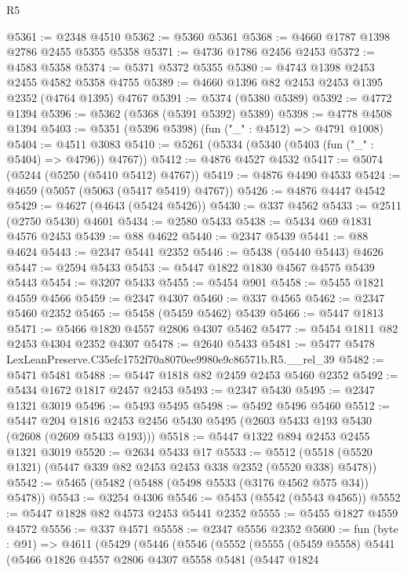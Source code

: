 \begin{lexlean}{R5}
\begin{coremodule}
@5361 := @2348 @4510
@5362 := @5360 @5361
@5368 := @4660 @1787 @1398 @2786 @2455 @5355 @5358
@5371 := @4736 @1786 @2456 @2453
@5372 := @4583 @5358
@5374 := @5371 @5372 @5355
@5380 := @4743 @1398 @2453 @2455 @4582 @5358 @4755
@5389 := @4660 @1396 @82 @2453 @2453 @1395 @2352 (@4764 @1395) @4767
@5391 := @5374 (@5380 @5389)
@5392 := @4772 @1394
@5396 := @5362 (@5368 (@5391 @5392) @5389)
@5398 := @4778 @4508 @1394
@5403 := @5351 (@5396 @5398) (fun ("_" : @4512) => @4791 @1008)
@5404 := @4511 @3083
@5410 := @5261 (@5334 (@5340 (@5403 (fun ("_" : @5404) => @4796)) @4767))
@5412 := @4876 @4527 @4532
@5417 := @5074 (@5244 (@5250 (@5410 @5412) @4767))
@5419 := @4876 @4490 @4533
@5424 := @4659 (@5057 (@5063 (@5417 @5419) @4767))
@5426 := @4876 @4447 @4542
@5429 := @4627 (@4643 (@5424 @5426))
@5430 := @337 @4562
@5433 := @2511 (@2750 @5430) @4601
@5434 := @2580 @5433
@5438 := @5434 @69 @1831 @4576 @2453
@5439 := @88 @4622
@5440 := @2347 @5439
@5441 := @88 @4624
@5443 := @2347 @5441 @2352
@5446 := @5438 (@5440 @5443) @4626
@5447 := @2594 @5433
@5453 := @5447 @1822 @1830 @4567 @4575 @5439 @5443
@5454 := @3207 @5433
@5455 := @5454 @901
@5458 := @5455 @1821 @4559 @4566
@5459 := @2347 @4307
@5460 := @337 @4565
@5462 := @2347 @5460 @2352
@5465 := @5458 (@5459 @5462) @5439
@5466 := @5447 @1813
@5471 := @5466 @1820 @4557 @2806 @4307 @5462
@5477 := @5454 @1811 @82 @2453 @4304 @2352 @4307
@5478 := @2640 @5433
@5481 := @5477 @5478 LexLeanPreserve.C35efc1752f70a8070ee9980e9c86571b.R5.__rel_39
@5482 := @5471 @5481
@5488 := @5447 @1818 @82 @2459 @2453 @5460 @2352
@5492 := @5434 @1672 @1817 @2457 @2453
@5493 := @2347 @5430
@5495 := @2347 @1321 @3019
@5496 := @5493 @5495
@5498 := @5492 @5496 @5460
@5512 := @5447
    @204
    @1816
    @2453
    @2456
    @5430
    @5495
    (@2603 @5433 @193 @5430 (@2608 (@2609 @5433 @193)))
@5518 := @5447 @1322 @894 @2453 @2455 @1321 @3019
@5520 := @2634 @5433 @17
@5533 := @5512 (@5518 (@5520 @1321) (@5447 @339 @82 @2453 @2453 @338 @2352 (@5520 @338) @5478))
@5542 := @5465 (@5482 (@5488 (@5498 @5533 (@3176 @4562 @575 @34)) @5478))
@5543 := @3254 @4306
@5546 := @5453 (@5542 (@5543 @4565))
@5552 := @5447 @1828 @82 @4573 @2453 @5441 @2352
@5555 := @5455 @1827 @4559 @4572
@5556 := @337 @4571
@5558 := @2347 @5556 @2352
@5600 := fun (byte : @91) =>
  @4611
    (@5429
      (@5446
        (@5546
          (@5552
            (@5555
              (@5459 @5558)
              @5441
              (@5466
                @1826
                @4557
                @2806
                @4307
                @5558
                @5481
                (@5447
                  @1824

\end{coremodule}
\end{lexlean}
